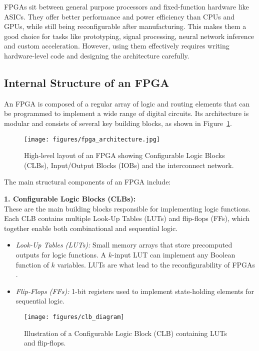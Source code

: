 \documentclass[a4paper,12pt]{report}
\begin{document}
FPGAs sit between general purpose processors and fixed-function hardware like ASICs. They offer better performance and power efficiency than CPUs and GPUs, while still being reconfigurable after manufacturing. This makes them a good choice for tasks like prototyping, signal processing, neural network inference and custom acceleration. However, using them effectively requires writing hardware-level code and designing the architecture carefully.

\clearpage
\subsection{Internal Structure of an FPGA}
An FPGA is composed of a regular array of logic and routing elements that can be programmed to implement a wide range of digital circuits. Its architecture is modular and consists of several key building blocks, as shown in Figure~\ref{fig:fpga_architecture}.

\begin{figure}[htbp]
    \centering
    \texttt{[image: figures/fpga\_architecture.jpg]}
    \caption{High-level layout of an FPGA showing Configurable Logic Blocks (CLBs), Input/Output Blocks (IOBs) and the interconnect network.}
    \label{fig:fpga_architecture}
\end{figure}

The main structural components of an FPGA include:

\textbf{1. Configurable Logic Blocks (CLBs):} \\ 
These are the main building blocks responsible for implementing logic functions. Each CLB contains multiple Look-Up Tables (LUTs) and flip-flops (FFs), which together enable both combinational and sequential logic. 
\begin{itemize}
    \item \textit{Look-Up Tables (LUTs):} Small memory arrays that store precomputed outputs for logic functions. A \(k\)-input LUT can implement any Boolean function of \(k\) variables. LUTs are what lead to the reconfigurability of FPGAs \cite[see p.~33]{1130285376382978560}.
    \item \textit{Flip-Flops (FFs):} 1-bit registers used to implement state-holding elements for sequential logic.
\end{itemize}
\begin{figure}[htbp]
    \centering
    \texttt{[image: figures/clb\_diagram]}
    \caption{Illustration of a Configurable Logic Block (CLB) containing LUTs and flip-flops.}
    \label{fig:clb_diagram}
\end{figure}
\FloatBarrier
\end{document}
